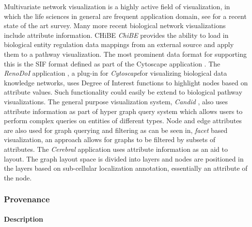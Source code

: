 Multivariate network visualization is a highly active field of visualization, in which the life sciences in general are frequent application domain, see \cite{} for a recent state of the art survey.
Many more recent biological network visualizations include attribute information.
CHiBE \textit{ChiBE}\cite{Babur2010chibe} provides the ability to load in biological entity regulation data mappings from an external source and apply them to a pathway visualization.
The most prominent data format for supporting this is the SIF format defined as part of the Cytoscape application \cite{Shannon2003cytoscape}.
The \textit{RenoDoI} application \cite{Vehlow2015}, a plug-in for \textit{Cytoscape}for visualizing biological data knowledge networks, uses Degree of Interest functions to highlight nodes based on attribute values.
Such functionality could easily be extend to biological pathway visualizations.
The general purpose visualization system, \textit{Candid} \cite{Shadoan2013}, also uses attribute information as part of hyper graph query system which allows users to perform complex queries on entities of different types.
Node and edge attributes are also used for graph querying and filtering as can be seen in, \textit{facet} based visualization, an approach allows for graphs to be filtered by subsets of attributes.
The \textit{Cerebral} application \cite{Barsky2008cerebral} uses attribute information as an aid to layout.
The graph layout space is divided into layers and nodes are positioned in the layers based on sub-cellular localization annotation, essentially an attribute of the node.

\subsubsection*{Provenance}

\paragraph*{Description}

